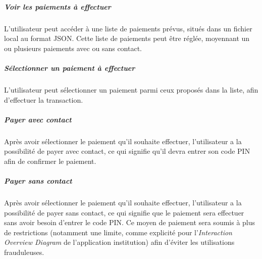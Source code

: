 \subparagraph{Voir les paiements à effectuer} L'utilisateur peut accéder à une liste de paiements prévus, situés dans un fichier local au format JSON. Cette liste de paiements peut être réglée, moyennant un ou plusieurs paiements avec ou sans contact.


\subparagraph{Sélectionner un paiement à effectuer} L'utilisateur peut sélectionner un paiement parmi ceux proposés dans la liste, afin d'effectuer la transaction.


\subparagraph{Payer avec contact} Après avoir sélectionner le paiement qu'il souhaite effectuer, l'utilisateur a la possibilité de payer avec contact, ce qui signifie qu'il devra entrer son code PIN afin de confirmer le paiement.


\subparagraph{Payer sans contact} Après avoir sélectionner le paiement qu'il souhaite effectuer, l'utilisateur a la possibilité de payer sans contact, ce qui signifie que le paiement sera effectuer sans avoir besoin d'entrer le code PIN. Ce moyen de paiement sera soumis à plus de restrictions (notamment une limite, comme explicité pour l'\emph{Interaction Overview Diagram} de l'application institution) afin d'éviter les utilisations frauduleuses.